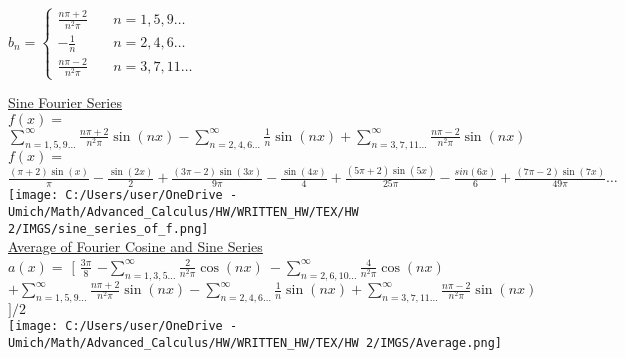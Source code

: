 \documentclass[a4paper,man,natbib]{apa6}
\begin{document}
\begin{center}
    \color{red}
    \hfill \break
    $ b_n = \begin{cases}
        \frac{n\pi + 2}{n^2\pi} & \quad n = 1, 5, 9 \dots \\
        -\frac{1}{n} & \quad n = 2, 4, 6 \dots \\
        \frac{n\pi - 2}{n^2\pi} & \quad n = 3, 7, 11 \dots
    \end{cases}$ \\
    \color{black}

    \newpage

    \hfill \break
    \underline{Sine Fourier Series} \\

    $ f(x) = $ \color{red} $ \sum_{n = 1, 5, 9 \dots}^{\infty} \frac{n\pi + 2}{n^2\pi} \sin (nx) - \sum_{n = 2, 4, 6 \dots}^{\infty} \frac{1}{n} \sin (nx) + \sum_{n = 3, 7, 11 \dots}^{\infty} \frac{n\pi - 2}{n^2\pi} \sin (nx) $ \color{black} \\ 

    $ f(x) = $ \color{red} $ \frac{(\pi + 2)\sin(x)}{\pi} - \frac{\sin(2x)}{2} + \frac{(3\pi - 2)\sin(3x)}{9\pi} - \frac{\sin(4x)}{4} + \frac{(5\pi + 2)\sin(5x)}{25\pi} - \frac{sin(6x)}{6} + \frac{(7\pi - 2)\sin(7x)}{49\pi} \dots $ \color{black} \\
    
    \hfill \break
    \texttt{[image: C:/Users/user/OneDrive - Umich/Math/Advanced\_Calculus/HW/WRITTEN\_HW/TEX/HW 2/IMGS/sine\_series\_of\_f.png]} \\

    \newpage
    \underline{Average of Fourier Cosine and Sine Series} \\

    \color{teal} $ a(x) = $ \color{black} $ [ $ \color{violet} $ \frac{3\pi}{8} $ \color{blue} $ - \sum_{n = 1, 3, 5 \dots}^{\infty} \frac{2}{n^2\pi} \cos(nx)\ - \sum_{n = 2, 6, 10 \dots}^{\infty} \frac{4}{n^2\pi} \cos(nx) $ \color{red} 
    $ + \sum_{n = 1, 5, 9 \dots}^{\infty} \frac{n\pi + 2}{n^2\pi} \sin (nx) - \sum_{n = 2, 4, 6 \dots}^{\infty} \frac{1}{n} \sin (nx) + \sum_{n = 3, 7, 11 \dots}^{\infty} \frac{n\pi - 2}{n^2\pi} \sin (nx) $ \color{black} $ ]/2 $ \\ 

    \hfill \break
    \texttt{[image: C:/Users/user/OneDrive - Umich/Math/Advanced\_Calculus/HW/WRITTEN\_HW/TEX/HW 2/IMGS/Average.png]} \\

\end{center}
\end{document}

